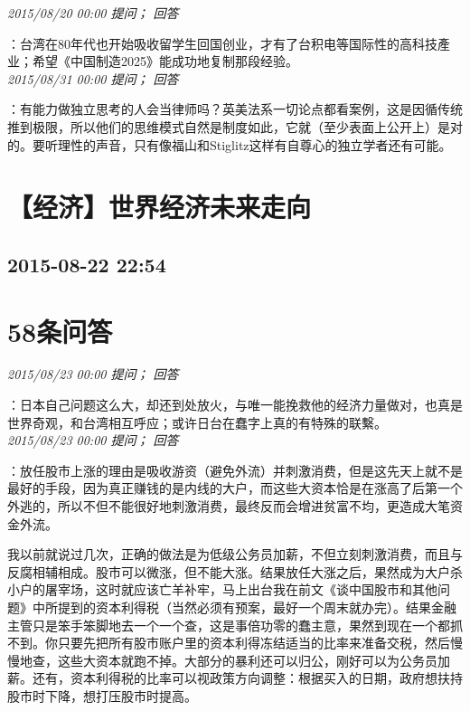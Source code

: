 \documentclass[twocolumn]{ctexart}
\begin{document}
\textit{\hfill\noindent\small 2015/08/20 00:00 提问； 回答}

：台湾在80年代也开始吸收留学生回国创业，才有了台积电等国际性的高科技產业；希望《中国制造2025》能成功地复制那段经验。\\

\textit{\hfill\noindent\small 2015/08/31 00:00 提问； 回答}

：有能力做独立思考的人会当律师吗？英美法系一切论点都看案例，这是因循传统推到极限，所以他们的思维模式自然是制度如此，它就（至少表面上公开上）是对的。要听理性的声音，只有像福山和Stiglitz这样有自尊心的独立学者还有可能。\\


\section{【经济】世界经济未来走向}
\subsection{2015-08-22 22:54}


\section{58条问答}

\textit{\hfill\noindent\small 2015/08/23 00:00 提问； 回答}

：日本自己问题这么大，却还到处放火，与唯一能挽救他的经济力量做对，也真是世界奇观，和台湾相互呼应；或许日台在蠢字上真的有特殊的联繫。\\

\textit{\hfill\noindent\small 2015/08/23 00:00 提问； 回答}

：放任股市上涨的理由是吸收游资（避免外流）并刺激消费，但是这先天上就不是最好的手段，因为真正赚钱的是内线的大户，而这些大资本恰是在涨高了后第一个外逃的，所以不但不能很好地刺激消费，最终反而会增进贫富不均，更造成大笔资金外流。

我以前就说过几次，正确的做法是为低级公务员加薪，不但立刻刺激消费，而且与反腐相辅相成。股市可以微涨，但不能大涨。结果放任大涨之后，果然成为大户杀小户的屠宰场，这时就应该亡羊补牢，马上出台我在前文《谈中国股市和其他问题》中所提到的资本利得税（当然必须有预案，最好一个周末就办完）。结果金融主管只是笨手笨脚地去一个一个查，这是事倍功零的蠢主意，果然到现在一个都抓不到。你只要先把所有股市账户里的资本利得冻结适当的比率来准备交税，然后慢慢地查，这些大资本就跑不掉。大部分的暴利还可以归公，刚好可以为公务员加薪。还有，资本利得税的比率可以视政策方向调整：根据买入的日期，政府想扶持股市时下降，想打压股市时提高。
\end{document}

